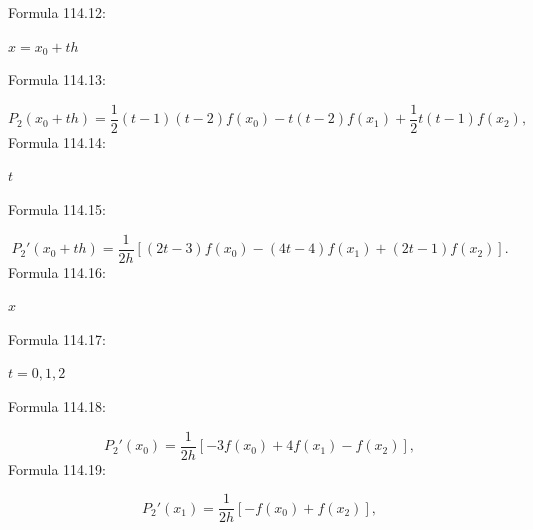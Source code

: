 \documentclass[11pt]{article}
\begin{document}
\noindent Formula 114.12:\par
$x=x_0+th$\par
\noindent Formula 114.13:\par
\[
P_2(x_0+th)=\frac12(t-1)(t-2)f(x_0)-t(t-2)f(x_1)
+\frac12t(t-1)f(x_2),
\]
\noindent Formula 114.14:\par
$t$\par
\noindent Formula 114.15:\par
\[
P_2'(x_0+th)=\frac1{2h}[(2t-3)f(x_0)-(4t-4)f(x_1)+(2t-1)f(x_2)].
\tag{4.5.3}
\]
\noindent Formula 114.16:\par
$x$\par
\noindent Formula 114.17:\par
$t=0,1,2$\par
\noindent Formula 114.18:\par
\[
P_2'(x_0)=\frac1{2h}[-3f(x_0)+4f(x_1)-f(x_2)],
\]
\noindent Formula 114.19:\par
\[
P_2'(x_1)=\frac1{2h}[-f(x_0)+f(x_2)],
\]
\clearpage
\end{document}
